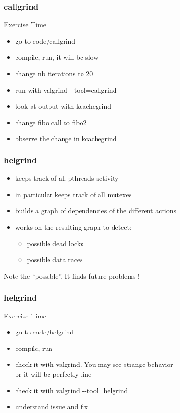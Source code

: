 \begin{frame}[fragile]
  \frametitle{callgrind}
  \begin{alertblock}{Exercise Time}
    \begin{itemize}
    \item go to code/callgrind
    \item compile, run, it will be slow
    \item change nb iterations to 20
    \item run with valgrind -{}-tool=callgrind
    \item look at output with kcachegrind
    \item change fibo call to fibo2
    \item observe the change in kcachegrind
    \end{itemize}
  \end{alertblock}
\end{frame}

\begin{frame}[fragile]
  \frametitle{helgrind}
  \begin{block}{}
    \begin{itemize}
      \item keeps track of all pthreads activity
      \item in particular keeps track of all mutexes
      \item builds a graph of dependencies of the different actions
      \item works on the resulting graph to detect:
        \begin{itemize}
        \item possible dead locks
        \item possible data races
        \end{itemize}
    \end{itemize}
  \end{block}
  \pause
  \begin{alertblock}{}
    Note the ``possible''. It finds future problems !
  \end{alertblock}
\end{frame}

\begin{frame}[fragile]
  \frametitle{helgrind}
  \begin{alertblock}{Exercise Time}
    \begin{itemize}
    \item go to code/helgrind
    \item compile, run
    \item check it with valgrind. You may see strange behavior \\
      or it will be perfectly fine
    \item check it with valgrind -{}-tool=helgrind
    \item understand issue and fix
    \end{itemize}
  \end{alertblock}
\end{frame}

